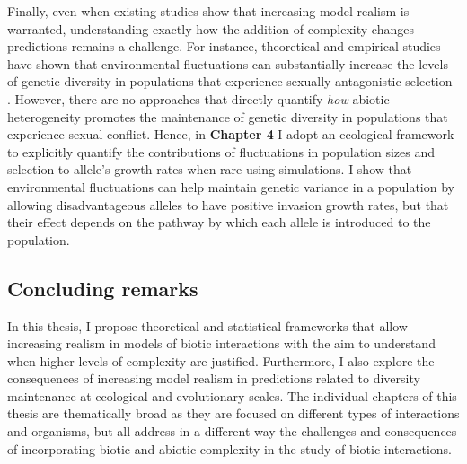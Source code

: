 \documentclass[12pt]{article}
\begin{document}
Finally, even when existing studies show that increasing model realism is warranted, understanding exactly how the addition of complexity changes predictions remains a challenge. For instance, theoretical and empirical studies have shown that environmental fluctuations can substantially increase the levels of genetic diversity in populations that experience sexually antagonistic selection \citep{connallon2012general,connallon_evolutionary_2019, glaser2021sexual}. However, there are no approaches that directly quantify \textit{how} abiotic heterogeneity promotes the maintenance of genetic diversity in populations that experience sexual conflict. Hence, in \textbf{Chapter 4} I adopt an ecological framework to explicitly quantify the contributions of fluctuations in population sizes and selection to allele's growth rates when rare using simulations. I show that environmental fluctuations can help maintain genetic variance in a population by allowing disadvantageous alleles to have positive invasion growth rates,  but that their effect depends on the pathway by which each allele is introduced to the population.


\subsection*{Concluding remarks}


In this thesis, I propose theoretical and statistical frameworks that allow increasing realism in models of biotic interactions with the aim to understand when higher levels of complexity are justified. Furthermore, I also explore the consequences of increasing model realism in predictions related to diversity maintenance at ecological and evolutionary scales. The individual chapters of this thesis are thematically broad as they are focused on different types of interactions and organisms, but all address in a different way the challenges and consequences of incorporating biotic and abiotic complexity in the study of biotic interactions.
\end{document}
